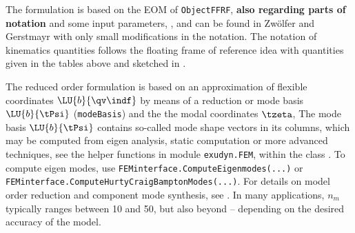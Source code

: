     \finishTable
    The formulation is based on the EOM of \texttt{ObjectFFRF}, {\bf also regarding parts of notation} 
    and some input parameters, , and 
    can be found in Zw{\"o}lfer and Gerstmayr \cite{ZwoelferGerstmayr2021} with only small modifications in the notation.
    The notation of kinematics quantities follows the floating frame of reference idea with
    quantities given in the tables above and sketched in .

                       
    The reduced order  formulation is based on an approximation of flexible coordinates $\LU{b}{\qv\indf}$ 
    by means of a reduction or mode basis $\LU{b}{\tPsi}$ (\texttt{modeBasis}) and the the modal coordinates $\tzeta$,
    \be
       \approx {} \tzeta
    \ee
    The mode basis $\LU{b}{\tPsi}$ contains so-called mode shape vectors in its columns, which may be computed from eigen analysis, static computation or more advanced techniques, 
    see the helper functions in module \texttt{exudyn.FEM}, within the class .
    To compute eigen modes, use \texttt{FEMinterface.ComputeEigenmodes(...)} or
    \texttt{FEMinterface.ComputeHurtyCraigBamptonModes(...)}. For details on model order reduction and component mode synthesis, see .
    In many applications, $n_m$ typically ranges between 10 and 50, but also beyond -- depending on the desired accuracy of the model.
    
